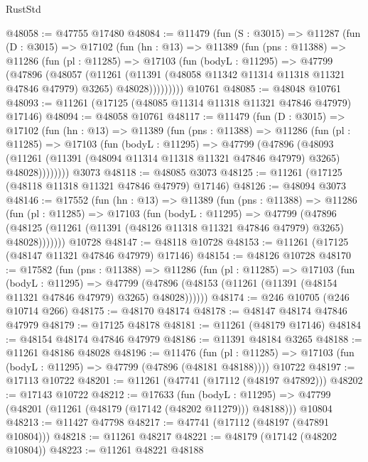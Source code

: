\begin{lexlean}{RustStd}
\begin{coremodule}
@48058 := @47755 @17480
@48084 := @11479
    (fun (S : @3015) =>
    @11287
      (fun (D : @3015) =>
      @17102
        (fun (hn : @13) =>
        @11389
          (fun (pns : @11388) =>
          @11286
            (fun (pl : @11285) =>
            @17103
              (fun (bodyL : @11295) =>
              @47799
                (@47896
                  (@48057
                    (@11261
                      (@11391 (@48058 @11342 @11314 @11318 @11321 @47846 @47979) @3265)
                      @48028)))))))))
    @10761
@48085 := @48048 @10761
@48093 := @11261 (@17125 (@48085 @11314 @11318 @11321 @47846 @47979) @17146)
@48094 := @48058 @10761
@48117 := @11479
    (fun (D : @3015) =>
    @17102
      (fun (hn : @13) =>
      @11389
        (fun (pns : @11388) =>
        @11286
          (fun (pl : @11285) =>
          @17103
            (fun (bodyL : @11295) =>
            @47799
              (@47896
                (@48093
                  (@11261 (@11391 (@48094 @11314 @11318 @11321 @47846 @47979) @3265) @48028))))))))
    @3073
@48118 := @48085 @3073
@48125 := @11261 (@17125 (@48118 @11318 @11321 @47846 @47979) @17146)
@48126 := @48094 @3073
@48146 := @17552
    (fun (hn : @13) =>
    @11389
      (fun (pns : @11388) =>
      @11286
        (fun (pl : @11285) =>
        @17103
          (fun (bodyL : @11295) =>
          @47799
            (@47896
              (@48125 (@11261 (@11391 (@48126 @11318 @11321 @47846 @47979) @3265) @48028)))))))
    @10728
@48147 := @48118 @10728
@48153 := @11261 (@17125 (@48147 @11321 @47846 @47979) @17146)
@48154 := @48126 @10728
@48170 := @17582
    (fun (pns : @11388) =>
    @11286
      (fun (pl : @11285) =>
      @17103
        (fun (bodyL : @11295) =>
        @47799 (@47896 (@48153 (@11261 (@11391 (@48154 @11321 @47846 @47979) @3265) @48028))))))
@48174 := @246 @10705 (@246 @10714 @266)
@48175 := @48170 @48174
@48178 := @48147 @48174 @47846 @47979
@48179 := @17125 @48178
@48181 := @11261 (@48179 @17146)
@48184 := @48154 @48174 @47846 @47979
@48186 := @11391 @48184 @3265
@48188 := @11261 @48186 @48028
@48196 := @11476
    (fun (pl : @11285) => @17103 (fun (bodyL : @11295) => @47799 (@47896 (@48181 @48188))))
    @10722
@48197 := @17113 @10722
@48201 := @11261 (@47741 (@17112 (@48197 @47892)))
@48202 := @17143 @10722
@48212 := @17633
    (fun (bodyL : @11295) => @47799 (@48201 (@11261 (@48179 (@17142 (@48202 @11279))) @48188)))
    @10804
@48213 := @11427 @47798
@48217 := @47741 (@17112 (@48197 (@47891 @10804)))
@48218 := @11261 @48217
@48221 := @48179 (@17142 (@48202 @10804))
@48223 := @11261 @48221 @48188

\end{coremodule}
\end{lexlean}
